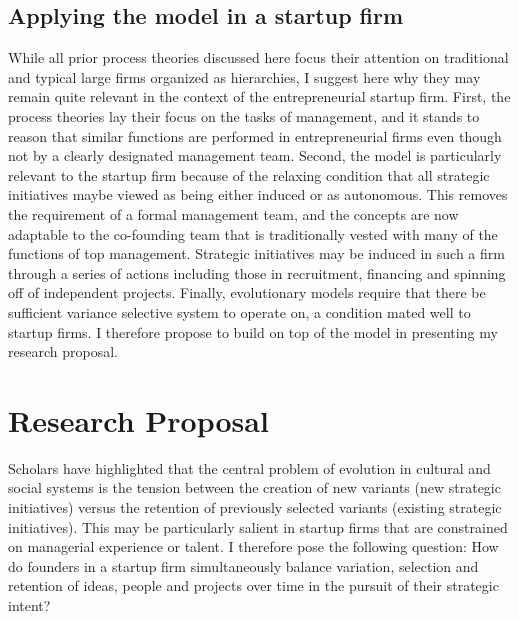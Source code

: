 \documentclass[12pt,letterpaper]{article}
\begin{document}
\subsection{Applying the  \cite{Lovas2000} model in a startup firm}
While all prior process theories discussed here focus their attention on traditional and typical large firms organized as hierarchies, I suggest here why they may remain quite relevant in the context of the entrepreneurial startup firm. First, the process theories lay their focus on the tasks of management, and it stands to reason that similar functions are performed in entrepreneurial firms even though not by a clearly designated management team. Second, the \cite{Lovas2000} model is particularly relevant to the startup firm because of the relaxing condition that all strategic initiatives maybe viewed as being either induced or as autonomous. This removes the requirement of a formal management team, and the concepts are now adaptable to the co-founding team that is traditionally vested with many of the functions of top management. Strategic initiatives may be induced in such a firm through a series of actions including those in recruitment,  financing and spinning off of independent projects. Finally, evolutionary models require that there be sufficient variance selective system to operate on, a condition mated well to startup firms. I therefore propose to build on top of the \cite{Lovas2000} model in presenting my research proposal.

\section{Research Proposal}
Scholars have highlighted that the central problem of evolution in cultural and social systems is the tension between the creation of new variants (new strategic initiatives) versus the retention of previously selected variants (existing strategic initiatives). This may be particularly salient in startup firms that are constrained on managerial experience or talent. I therefore pose the following question: How do founders in a startup firm simultaneously balance variation, selection and retention of ideas, people and projects over time in the pursuit of their strategic intent?
\end{document}
